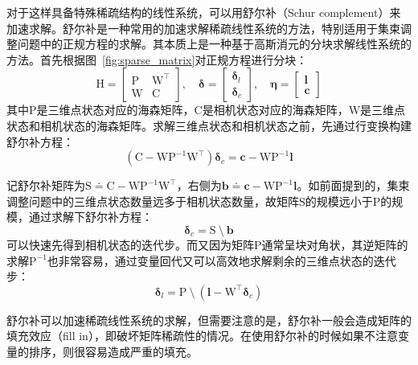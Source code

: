 对于这样具备特殊稀疏结构的线性系统，可以用舒尔补（Schur complement）来加速求解。舒尔补是一种常用的加速求解稀疏线性系统的方法，特别适用于集束调整问题中的正规方程的求解。其本质上是一种基于高斯消元的分块求解线性系统的方法。首先根据图~\ref{fig:sparse_matrix}对正规方程进行分块：
\begin{equation}
    \mathrm{H} =
    \begin{bmatrix}
        \mathrm{P} & \mathrm{W}^\top \\
        \mathrm{W} & \mathrm{C}
    \end{bmatrix}, \quad
    \bm{\delta} = \begin{bmatrix} \bm{\delta}_l \\ \bm{\delta}_c \end{bmatrix}, \quad
    \bm{\eta} = \begin{bmatrix} \bm{l} \\ \bm{c} \end{bmatrix}
\end{equation}
其中$\mathrm{P}$是三维点状态对应的海森矩阵，$\mathrm{C}$是相机状态对应的海森矩阵，$\mathrm{W}$是三维点状态和相机状态的海森矩阵。求解三维点状态和相机状态之前，先通过行变换构建舒尔补方程：
\begin{equation}
    \left( \mathrm{C}-\mathrm{W}\mathrm{P}^{-1}\mathrm{W}^\top \right)
    \bm{\delta}_c = \bm{c}-\mathrm{W}\mathrm{P}^{-1}\bm{l}
    \label{eq:schur_complement}
\end{equation}

记舒尔补矩阵为$\mathrm{S}\doteq\mathrm{C}-\mathrm{W}\mathrm{P}^{-1}\mathrm{W}^\top$，右侧为$\bm{b}\doteq\bm{c}-\mathrm{W}\mathrm{P}^{-1}\bm{l}$。如前面提到的，集束调整问题中的三维点状态数量远多于相机状态数量，故矩阵$\mathrm{S}$的规模远小于$\mathrm{P}$的规模，通过求解下舒尔补方程：
\begin{equation}
    \bm{\delta}_c = \mathrm{S} \:\setminus\: \bm{b}
    \label{eq:solve_schur}
\end{equation}
可以快速先得到相机状态的迭代步。而又因为矩阵$\mathrm{P}$通常呈块对角状，其逆矩阵的求解$\mathrm{P}^{-1}$也非常容易，通过变量回代又可以高效地求解剩余的三维点状态的迭代步：
\begin{equation}
    \bm{\delta}_l = \mathrm{P}
    \:\setminus\:
    \left( \bm{l}-\mathrm{W}^\top\bm{\delta}_c \right)
    \label{eq:back_sub}
\end{equation}

舒尔补可以加速稀疏线性系统的求解，但需要注意的是，舒尔补一般会造成矩阵的填充效应（fill in）\citep{kaess2008isam}，即破坏矩阵稀疏性的情况。在使用舒尔补的时候如果不注意变量的排序，则很容易造成严重的填充。


